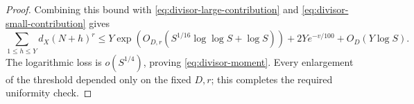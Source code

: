 \begin{proof}
Combining this bound with \eqref{eq:divisor-large-contribution}
and \eqref{eq:divisor-small-contribution} gives
\[
 \sum_{1\le h\le Y}d_X(N+h)^r
 \le Y\exp\!\left(
         O_{D,r}(S^{1/16}\log\log S+\log S)\right)
       +2Ye^{-v/100}+O_D(Y\log S).
\]
The logarithmic loss is \(o(S^{1/4})\), proving
\eqref{eq:divisor-moment}. Every enlargement of the threshold depended
only on the fixed \(D,r\); this completes the required uniformity check.
\end{proof}
